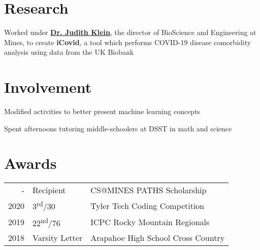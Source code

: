 \documentclass[]{darling-resume-openfont}
\begin{document}
\begin{minipage}[t]{0.66\textwidth}

\section{Research}
Worked under \textbf{\href{https://chemistry.mines.edu/project/klein-seetharaman-judith/}{Dr. Judith Klein}}, the director of BioScience and Engineering at Mines, to create \textbf{iCovid}, a tool which performs COVID-19 disease comorbidity analysis using data from the UK Biobank
\sectionsep


\section{Involvement}

\begin{tightemize}
\item Modified activities to better present machine learning concepts
\end{tightemize}
\sectionsep

\begin{tightemize}
\item Spent afternoons tutoring middle-schoolers at DSST in math and science
\end{tightemize}
\sectionsep


\section{Awards}
\begin{tabular}{rll}
- & Recipient & CS@MINES PATHS Scholarship \\
2020 & 3\textsuperscript{rd}/30 & Tyler Tech Coding Competition \\
2019 & 22\textsuperscript{nd}/76 & ICPC Rocky Mountain Regionals \\
2018 & Varsity Letter & Arapahoe High School Cross Country \\
\end{tabular}
\sectionsep


\end{minipage} 
\end{document}
